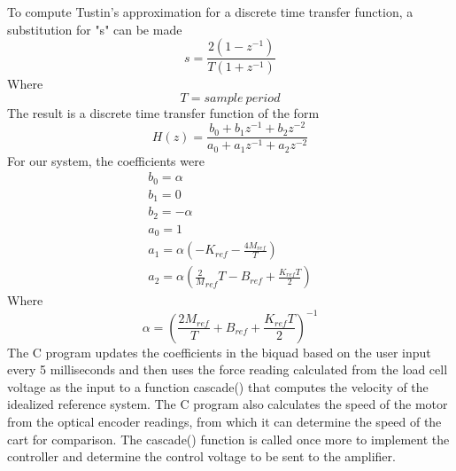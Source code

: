 To compute Tustin's approximation for a discrete time transfer function, a substitution for "s" can be made
\begin{equation}
s=\frac{2(1-z^{-1})}{T(1+z^{-1})}
\end{equation}
Where
\begin{equation}
T= sample\ period
\end{equation}
The result is a discrete time transfer function of the form
\begin{equation}
H(z)=\frac{b_{0}+b_{1}z^{-1}+b_{2}z^{-2}}{a_{0}+a_{1}z^{-1}+a_{2}z^{-2}}
\end{equation}
For our system, the coefficients were
\begin{eqnarray}
b_{0}=\alpha \\
b_{1}=0 \\
b_{2}=-\alpha \\
a_{0}=1 \\
a_{1}=\alpha(-K_{ref}-\frac{4M_{ref}}{T}) \\
a_{2}=\alpha(\frac2M_{ref}{T}-B_{ref}+\frac{K_{ref}T}{2})
\end{eqnarray}
Where
\begin{equation}
\alpha=(\frac{2M_{ref}}{T}+B_{ref}+\frac{K_{ref}T}{2})^{-1}
\end{equation}
The C program updates the coefficients in the biquad based on the user input every 5 milliseconds and then uses the force reading calculated from the load cell voltage as the input to a function cascade() that computes the velocity of the idealized reference system. The C program also calculates the speed of the motor from the optical encoder readings, from which it can determine the speed of the cart for comparison. The cascade() function is called once more to implement the controller and determine the control voltage to be sent to the amplifier. 